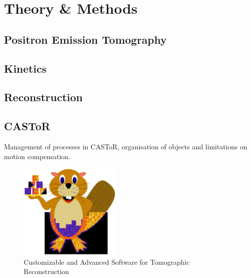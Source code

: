 \chapter{Theory \& Methods}

\section{Positron Emission Tomography}
 

\section{Kinetics}



\section{Reconstruction}

\section{CASToR}
Management of processes in CASToR, organisation of objects and limitations on motion compensation. 

\begin{figure}[htp]
    \centering
    \includegraphics[width=5cm]{2_Theory_Methods/figures/CASToR_logo_transparent_cut.png}
    \caption{Customizable and Advanced Software for Tomographic Reconstruction}
    \label{fig:galaxy}
\end{figure}